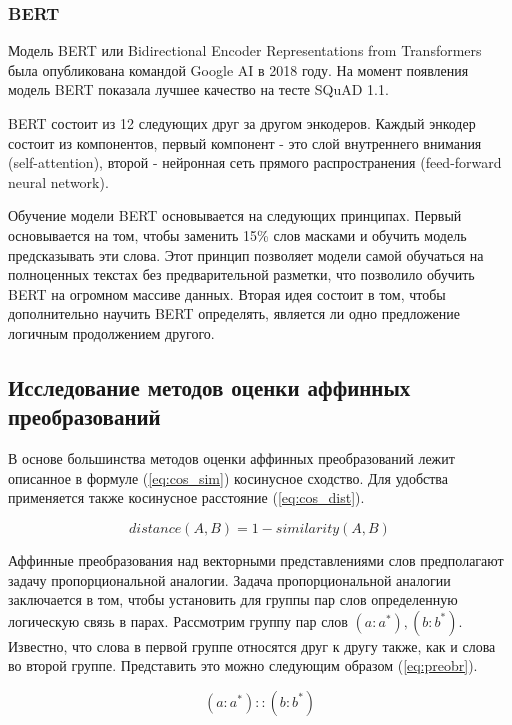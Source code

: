 \documentclass[a4paper,14pt]{article}
\begin{document}
	\subsubsection{BERT}
	
	Модель BERT или Bidirectional Encoder Representations from Transformers была опубликована командой Google AI в 2018 году.
	На момент появления модель BERT показала лучшее качество на тесте SQuAD 1.1.
	
	BERT состоит из 12 следующих друг за другом энкодеров.
	Каждый энкодер состоит из компонентов, первый компонент - это слой внутреннего внимания (self-attention), второй - нейронная сеть прямого распространения (feed-forward neural network).
	
	Обучение модели BERT основывается на следующих принципах.	
	Первый основывается на том, чтобы заменить 15\% слов масками и обучить модель предсказывать эти слова.
	Этот принцип позволяет модели самой обучаться на полноценных текстах без предварительной разметки, что позволило обучить BERT на огромном массиве данных.
	Вторая идея состоит в том, чтобы дополнительно научить BERT определять, является ли одно предложение логичным продолжением другого.
	
	\subsection{Исследование методов оценки аффинных преобразований}
	
	В основе большинства методов оценки аффинных преобразований лежит описанное в формуле (\ref{eq:cos_sim}) косинусное сходство.
	Для удобства применяется также косинусное расстояние (\ref{eq:cos_dist}).
	
	\begin{equation}
		distance(A,B) = 1 - similarity(A,B)
		\label{eq:cos_dist}
	\end{equation}

	Аффинные преобразования над векторными представлениями слов предполагают задачу пропорциональной аналогии.
	Задача пропорциональной аналогии заключается в том, чтобы установить для группы пар слов определенную логическую связь в парах.
	Рассмотрим группу пар слов $(a: a^*), (b: b^*)$. 
	Известно, что слова в первой группе относятся друг к другу также, как и слова во второй группе.
	Представить это можно следующим образом (\ref{eq:preobr}).
	
	\begin{equation}
		(a: a^*) :: (b: b^*)
		\label{eq:preobr}
	\end{equation}
\end{document}
